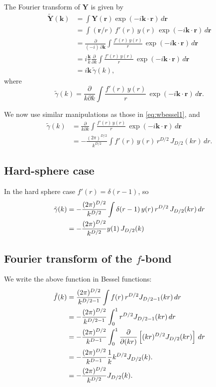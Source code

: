 \documentclass[aip,jcp,reprint,superscriptaddress]{revtex4-1}
\numberwithin{equation}{subsection}
\newcommand{\vct}[1]{\mathbf{#1}}
\providecommand{\vr}{} %
\renewcommand{\vr}{\vct{r}}
\newcommand{\vk}{\vct{k}}
\begin{document}
The Fourier transform of $\vct{Y}$ is given by
\begin{align*}
  \tilde{\vct{Y}}(\vk)
&=
\int \vct{Y}(\vr) \exp(-i\vk\cdot\vr) \, d\vr
\\
&=
\int (\vr/r) \, f'(r) \, y(r) \, \exp(-i\vk\cdot\vr) \, d\vr
\\
&=
\frac{\partial}{(-i) \, \partial \vk}
\int \frac{f'(r) \, y(r)}{r} \, \exp(-i\vk\cdot\vr) \, d\vr
\\
&=
i \frac{\vk}{k} \frac{\partial}{\partial k}
\int \frac{f'(r) \, y(r)}{r} \, \exp(-i\vk\cdot\vr) \, d\vr
\\
&=
i \vk \, \tilde{\gamma}(k),
\end{align*}
%
where
\[
\tilde{\gamma}(k)
=
\frac{\partial}{k\partial k}
\int \frac{f'(r) \, y(r)}{r} \, \exp(-i\vk\cdot\vr) \, d\vr.
\]

We now use similar manipulations as
those in \eqref{eq:wbessel1}, and
\begin{align*}
\tilde{\gamma}(k)
&=
\frac{\partial}{k\partial k}
\int \frac{f'(r) \, y(r)}{r} \, \exp(-i\vk\cdot\vr) \, d\vr
\\
&=-\frac{(2\pi)^{D/2}}{k^{D/2}}
\int f'(r) \, y(r) \, r^{D/2} \, J_{D/2}(kr) \, dr.
\end{align*}


\subsection{Hard-sphere case}

In the hard sphere case $f'(r) = \delta(r - 1)$,
so
\begin{align}
\tilde{\gamma}(k)
&=-\frac{(2\pi)^{D/2}}{k^{D/2}}
\int \delta(r - 1) \, y(r) \, r^{D/2} \, J_{D/2}(kr) \, dr
\notag \\
&=-\frac{(2\pi)^{D/2}}{k^{D/2}}
y(1) \, J_{D/2}(k)
\label{eq:gammahs}
\end{align}



\subsection{Fourier transform of the $f$-bond}

We write the above function in Bessel functions:
\begin{align}
  \tilde{f}(k)
&=
\frac{(2\pi)^{D/2}}{k^{D/2-1}}
\int f(r) \, r^{D/2} J_{D/2-1}(kr) \, dr
\notag \\
&=
-\frac{(2\pi)^{D/2}}{k^{D/2-1}}
\int_0^1 r^{D/2} J_{D/2-1}(kr) \, dr
\notag \\
&=
-\frac{(2\pi)^{D/2}}{k^{D-1}}
\int_0^1 \frac{\partial}{\partial (kr)}
\left[(kr)^{D/2} J_{D/2}(kr) \right] \, dr
\notag \\
&=
-\frac{(2\pi)^{D/2}}{k^{D-1}} \frac{1}{k}
k^{D/2} J_{D/2}(k).
\notag \\
&=
-\frac{(2\pi)^{D/2}}{k^{D/2}} J_{D/2}(k).
\end{align}
\end{document}
